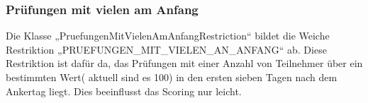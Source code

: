 \subsubsection{Prüfungen mit vielen am Anfang}\label{subsubsec:pruefungenMitVielenAmAnfang}
Die Klasse „PruefungenMitVielenAmAnfangRestriction“ bildet die Weiche Restriktion „PRUEFUNGEN\_MIT\_VIELEN\_AN\_ANFANG“ ab.
Diese Restriktion ist dafür da, das Prüfungen mit einer Anzahl von Teilnehmer über ein bestimmten Wert( aktuell sind es 100) in den ersten sieben Tagen nach dem Ankertag liegt.
Dies beeinflusst das Scoring nur leicht.

